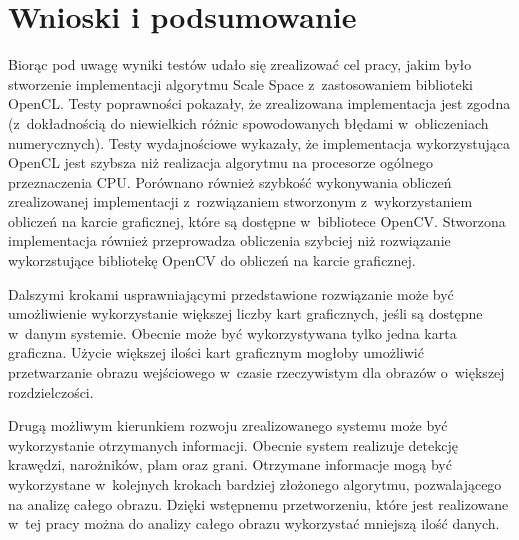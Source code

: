 \chapter{Wnioski i podsumowanie}
\label{cha:podsumowanie}

Biorąc pod uwagę wyniki testów udało się zrealizować cel pracy, jakim było stworzenie implementacji algorytmu Scale Space z~zastosowaniem biblioteki OpenCL. Testy poprawności pokazały, że zrealizowana implementacja jest zgodna (z~dokładnością do niewielkich różnic spowodowanych błędami w~obliczeniach numerycznych). Testy wydajnościowe wykazały, że implementacja wykorzystująca OpenCL jest szybsza niż realizacja algorytmu na procesorze ogólnego przeznaczenia CPU. Porównano również szybkość wykonywania obliczeń zrealizowanej implementacji z~rozwiązaniem stworzonym z~wykorzystaniem obliczeń na karcie graficznej, które są dostępne w~bibliotece OpenCV. Stworzona implementacja również przeprowadza obliczenia szybciej niż rozwiązanie wykorzstujące bibliotekę OpenCV do obliczeń na karcie graficznej.

Dalszymi krokami usprawniającymi przedstawione rozwiązanie może być umożliwienie wykorzystanie większej liczby kart graficznych, jeśli są dostępne w~danym systemie. Obecnie może być wykorzystywana tylko jedna karta graficzna. Użycie większej ilości kart graficznym mogłoby umożliwić przetwarzanie obrazu wejściowego w~czasie rzeczywistym dla obrazów o~większej rozdzielczości.

Drugą możliwym kierunkiem rozwoju zrealizowanego systemu może być wykorzystanie otrzymanych informacji. Obecnie system realizuje detekcję krawędzi, narożników, plam oraz grani. Otrzymane informacje mogą być wykorzystane w~kolejnych krokach bardziej złożonego algorytmu, pozwalającego na analizę całego obrazu. Dzięki wstępnemu przetworzeniu, które jest realizowane w~tej pracy można do analizy całego obrazu wykorzystać mniejszą ilość danych.
